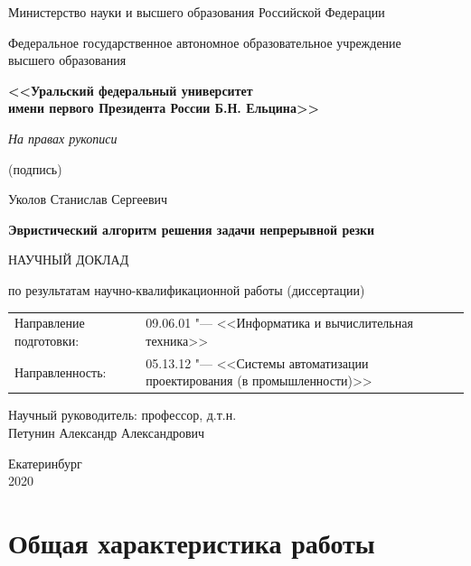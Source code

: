 \documentclass[14pt]{extarticle}
\theoremstyle{plain}%
\theoremstyle{remark}
\begin{document}
\thispagestyle{empty}
\begin{center}
{\small
Министерство науки и высшего образования Российской Федерации

Федеральное государственное автономное образовательное учреждение \\
высшего образования

\textbf{<<Уральский федеральный университет\\
имени первого Президента России Б.Н. Ельцина>>}
}

\vspace{0pt plus2fill}
\begin{flushright}
\begin{minipage}{0.5\linewidth}
  \centering
  \textit{На правах рукописи}

  \small {(подпись)}
\end{minipage}
\end{flushright}


\vspace{0pt plus4fill}
Уколов Станислав Сергеевич

\vspace{0pt plus1fill}
\textbf{
Эвристический алгоритм решения задачи непрерывной резки
}

\vspace{0pt plus1fill}
НАУЧНЫЙ ДОКЛАД

по результатам научно-квалификационной работы (диссертации)

\vspace{0pt plus2fill}
{\small
\begin{tabu}{X[-1]X}
  Направление подготовки: &
  09.06.01
  "---
  <<Информатика и вычислительная техника>>
  \\
  Направленность: &
  05.13.12
  "---
  <<Системы автоматизации проектирования (в промышленности)>>
\end{tabu}
}

\vspace{0pt plus4fill}
\begin{flushright}
Научный руководитель:
профессор,
д.т.н.
\\
Петунин Александр Александрович
\end{flushright}

\vspace{0pt plus6fill}
Екатеринбург
\\
2020
\end{center}
\newpage

\tableofcontents
\newpage

\section{Общая характеристика работы}
\end{document}
